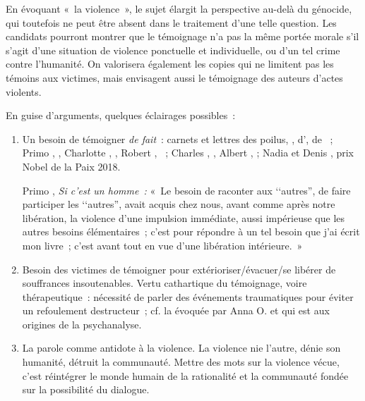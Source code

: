 {En évoquant «~la violence~», le sujet élargit la perspective au-delà du génocide, qui toutefois
ne peut être absent dans le traitement d'une telle question. Les candidats pourront montrer que
le témoignage n'a pas la même portée morale s'il s'agit d'une situation de violence ponctuelle et
individuelle, ou d'un tel crime contre l'humanité. On valorisera également les copies qui ne limitent
pas les témoins aux victimes, mais envisagent aussi le témoignage des auteurs d'actes violents.

En guise d'arguments, quelques éclairages possibles~:

\begin{enumerate}
\item Un besoin de témoigner \textit{de fait}~: carnets et lettres des poilus, ,  d',  de ~; Primo , , Charlotte , , Robert , ~; Charles
, , Albert , ; Nadia  et Denis
, prix Nobel de la Paix 2018.

Primo , \textit{Si c'est un homme~:} «~Le besoin de raconter aux ‘‘autres'', de faire participer
les ‘‘autres'', avait acquis chez nous, avant comme après notre libération, la violence d'une
impulsion immédiate, aussi impérieuse que les autres besoins élémentaires~; c'est pour répondre
à un tel besoin que j'ai écrit mon livre~; c'est avant tout en vue d'une libération intérieure.~»

\item Besoin des victimes de témoigner pour extérioriser/évacuer/se libérer de souffrances
insoutenables. Vertu cathartique du témoignage, voire thérapeutique~: nécessité de parler des
événements traumatiques pour éviter un refoulement destructeur~; cf. la  évoquée
par Anna O. et qui est aux origines de la psychanalyse.

\item La parole comme antidote à la violence. La violence nie l'autre, dénie son humanité,
détruit la communauté. Mettre des mots sur la violence vécue, c'est réintégrer le monde humain
de la rationalité et la communauté fondée sur la possibilité du dialogue.


\end{enumerate}}
